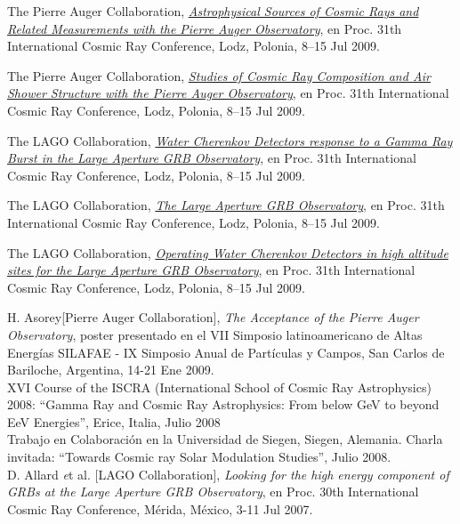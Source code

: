 \documentclass[11pt, a4paper]{article}
\newcommand{\years}[1]{\marginnote{\scriptsize #1}}
\begin{document}
\years{2009}The Pierre Auger Collaboration, \href{http://arxiv.org/abs/0906.2347}{\emph{Astrophysical Sources of Cosmic Rays and Related Measurements with the Pierre Auger Observatory}}, en Proc. 31th International Cosmic Ray Conference, Lodz, Polonia, 8--15 Jul 2009.

\years{2009}The Pierre Auger Collaboration, \href{http://arxiv.org/abs/0906.2319}{\emph{Studies of Cosmic Ray Composition and Air Shower Structure with the Pierre Auger Observatory}}, en Proc. 31th International Cosmic Ray Conference, Lodz, Polonia, 8--15 Jul 2009.

\years{2009}The LAGO Collaboration, \href{http://arxiv.org/abs/0906.0820}{\emph{Water Cherenkov Detectors response to a Gamma Ray Burst in the Large Aperture GRB Observatory}}, en Proc. 31th International Cosmic Ray Conference, Lodz, Polonia, 8--15 Jul 2009.

\years{2009}The LAGO Collaboration, \href{http://arxiv.org/abs/0906.0816}{\emph{The Large Aperture GRB Observatory}}, en Proc. 31th International Cosmic Ray Conference, Lodz, Polonia, 8--15 Jul 2009.

\years{2009}The LAGO Collaboration, \href{http://arxiv.org/abs/0906.0814}{\emph{Operating Water Cherenkov Detectors in high altitude sites for the Large Aperture GRB Observatory}}, en Proc. 31th International Cosmic Ray Conference, Lodz, Polonia, 8--15 Jul 2009.

\years{2009}H. Asorey[Pierre Auger Collaboration], {\emph{The Acceptance of the
Pierre Auger Observatory}}, poster presentado en el VII Simposio
latinoamericano de Altas Energías SILAFAE - IX Simposio Anual de Partículas y
Campos, San Carlos de Bariloche, Argentina, 14-21 Ene 2009.\\

\years{2008}XVI Course of the ISCRA (International School of Cosmic Ray
Astrophysics) 2008: “Gamma Ray and Cosmic Ray Astrophysics: From below GeV to
beyond EeV Energies”, Erice, Italia, Julio 2008\\

\years{2008}Trabajo en Colaboración en la Universidad de Siegen, Siegen,
Alemania. Charla invitada: “Towards Cosmic ray Solar Modulation Studies”, Julio
2008.\\

\years{2007}D. Allard {\emph et al.} [LAGO Collaboration], {\emph{Looking for
the high energy component of GRBs at the Large Aperture GRB Observatory}}, en
Proc. 30th International Cosmic Ray Conference,  Mérida, México, 3-11 Jul
2007.\\
\end{document}

